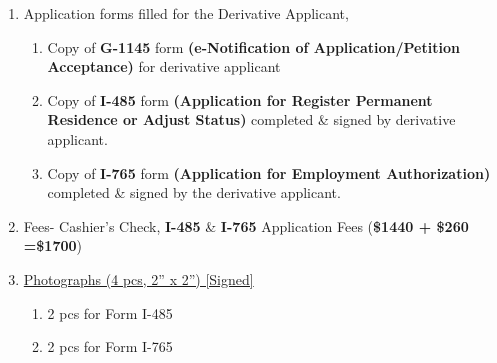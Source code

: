 \begin{enumerate}[label=\textbf{ Exhibit-\arabic*},start=15]
        \item {Application forms filled for the Derivative Applicant,}\begin{enumerate}[label=\roman*.]
       
        \item Copy of \textbf{G-1145} form \textbf{(e-Notification of Application/Petition Acceptance)} for derivative applicant
         \item {Copy of \textbf{I-485} form \textbf{(Application for Register Permanent Residence or Adjust Status)} completed \& signed by derivative applicant.}
        \item Copy of \textbf{I-765} form \textbf{(Application for Employment Authorization)} completed \& signed by the derivative applicant.
    \end{enumerate}
    \item Fees- Cashier's Check, \textbf{I-485} \& \textbf{I-765} Application Fees (\textbf{\$1440 + \$260 =\$1700}) %
    
    \item \hyperref[mim_exhibit2]{Photographs (4 pcs, 2” x 2”) [Signed]} \begin{enumerate}[label=\roman*.]
        \item {2 pcs for Form I-485}
        \item {2 pcs for Form I-765}
    \end{enumerate}



\end{enumerate}
